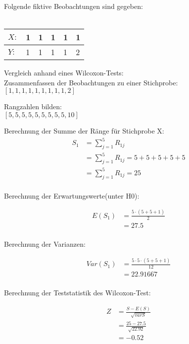 \documentclass[a4paper,12pt]{article}
\begin{document}
Folgende fiktive Beobachtungen sind gegeben:\\\\

\begin{tabular}{ | l | l | l | l | l | p{0.5cm} |}
	\hline
	$X:$ & 1 & 1 & 1 & 1 & 1 \\ \hline
	$Y:$ & 1 & 1 & 1 & 1 & 2 \\ \hline
\end{tabular}

Vergleich anhand eines Wilcoxon-Tests:\\

Zusammenfassen der Beobachtungen zu einer Stichprobe: \\

$[1,1,1,1,1,1,1,1,1,2]$

Rangzahlen bilden: \\

$[5,5,5,5,5,5,5,5,5,10]$


Berechnung der Summe der Ränge für Stichprobe X:
\begin{align*}
S_1 
&= \sum_{j=1}^{5} R_{1j} \\
&= \sum_{j=1}^{5} R_{1j} = 5+5+5+5+5 \\
&= \sum_{j=1}^{5} R_{1j} = 25	\\
\end{align*}

Berechnung der Erwartungswerte(unter H0):

\begin{align*}
E(S_1)
&= \frac{5\cdot(5+5+1)}{2} \\
&= 27.5 \\
\end{align*}


Berechnung der Varianzen:

\begin{align*}
Var(S_1)
&= \frac{5\cdot 5 \cdot (5+5+1)}{12} \\
&=  22.91667 \\
\end{align*}


Berechnung der Teststatistik des Wilcoxon-Test:

\begin{align*}
Z
&= \frac{S-E(S)}{\sqrt{varS}} \\
&= \frac{25-27.5}{\sqrt{22.92}}  \\
&=  -0.52 \\
\end{align*}
\end{document}
